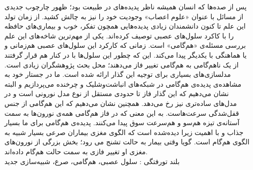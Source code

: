 


\pagestyle{empty}

پس از صده‌ها که انسان همیشه ناظر پدیده‌های در طبیعت بود؛ ظهور چارچوب جدیدی از مسائل با عنوان «علوم اعصاب» وجودیت خود را نیز به چالش کشید. از زمان تولد این علم تا کنون دانشمندان زیادی پدیده‌هایی همچون تفکر، خوب و بیماری‌های حافظه را با کاکرد سلول‌های عصبی توصیف کرده‌اند. یکی از مهم‌ترین شاخه‌های این علم بررسی مسئله‌ی «هم‌گامی» است. زمانی که کارکرد این سلول‌های عصبی هم‌زمانی و یا هماهنگی با یکدیگر پیدا می‌کند. این که چطور این سلول‌ها با در کنار هم قرار گرفتند از یک نا‌هم‌گامی به هم‌گامی تغییر فاز می‌دهند؛ محل بحث پژوهشگران زیادی است. مدلسازی‌های بسیاری برای توجیه این گذار ارائه شده است. ما در جستار خود به مشاهده‌ی پدیده‌ی هم‌گامی در شبکه‌های انباشت‌وشلیک و چرخنده می‌پردازیم و البته نشان می‌دهیم که این گذار فاز تا حدودی مستقل از نوع مدل نورونی است و در مدل‌های ساده‌تری نیز رخ می‌دهد. همچنین نشان می‌دهیم که این هم‌گامی از جنس قفل‌شدگی سرعت‌هاست. به این معنی که در فاز هم‌گامی همه‌ی نورون‌ها به سمت آستانه‌ی تیزه هم‌سو و هم‌سرعت سوق پیدا می‌کنند. پدیده‌ی هم‌گامی برای ما بسیار جذاب و با اهمیت زیرا دیده‌شده است که الگوی مغزی بیماران صرعی بسیار شبیه به الگوی هم‌گام است. گویا وقتی بیمار به حالت تشنج می رود؛ بخش بزرگی از نورون‌های مغزی او تغییر فازی به سمت حالت هم‌گام داده‌اند.
\\
‌بلند
‌تورفتگی : 
سلول عصبی، هم‌گامی، صرع، شبیه‌سازی
‌جدید